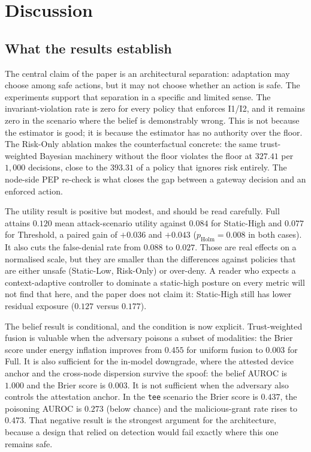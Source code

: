 \section{Discussion}
\label{sec:discussion}

\subsection{What the results establish}
\label{sec:what-established}

The central claim of the paper is an architectural separation: adaptation may
choose among safe actions, but it may not choose whether an action is safe. The
experiments support that separation in a specific and limited sense. The
invariant-violation rate is zero for every policy that enforces I1/I2, and it
remains zero in the scenario where the belief is demonstrably wrong. This is not
because the estimator is good; it is because the estimator has no authority over
the floor. The Risk-Only ablation makes the counterfactual concrete: the same
trust-weighted Bayesian machinery without the floor violates the floor at $327.41$
per $1{,}000$ decisions, close to the $393.31$ of a policy that ignores risk
entirely. The node-side PEP re-check is what closes the gap between a gateway
decision and an enforced action.

The utility result is positive but modest, and should be read carefully. Full
attains $0.120$ mean attack-scenario utility against $0.084$ for Static-High and
$0.077$ for Threshold, a paired gain of $+0.036$ and $+0.043$
($p_{\text{Holm}}=0.008$ in both cases). It also cuts the false-denial rate from
$0.088$ to $0.027$. Those are real effects on a normalised scale, but they are
smaller than the differences against policies that are either unsafe (Static-Low,
Risk-Only) or over-deny. A reader who expects a context-adaptive controller to
dominate a static-high posture on every metric will not find that here, and the
paper does not claim it: Static-High still has lower residual exposure
($0.127$ versus $0.177$).

The belief result is conditional, and the condition is now explicit. Trust-weighted
fusion is valuable when the adversary poisons a subset of modalities: the Brier
score under energy inflation improves from $0.455$ for uniform fusion to $0.003$
for Full. It is also sufficient for the in-model downgrade, where the attested
device anchor and the cross-node dispersion survive the spoof: the belief AUROC is
$1.000$ and the Brier score is $0.003$. It is not sufficient when the adversary
also controls the attestation anchor. In the \texttt{tee} scenario the Brier score
is $0.437$, the poisoning AUROC is $0.273$ (below chance) and the malicious-grant
rate rises to $0.473$. That negative result is the strongest argument for the
architecture, because a design that relied on detection would fail exactly where
this one remains safe.

